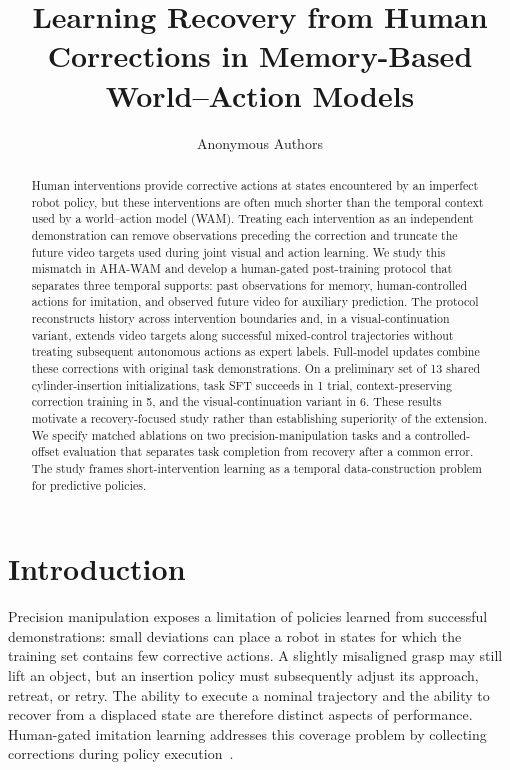 \documentclass[letterpaper,10pt,conference]{ieeeconf}
\title{Learning Recovery from Human Corrections in Memory-Based World--Action Models}
\author{Anonymous Authors}
\begin{document}
\maketitle
\thispagestyle{empty}
\pagestyle{empty}

\begin{abstract}
Human interventions provide corrective actions at states encountered by an imperfect robot policy, but these interventions are often much shorter than the temporal context used by a world--action model (WAM). Treating each intervention as an independent demonstration can remove observations preceding the correction and truncate the future video targets used during joint visual and action learning. We study this mismatch in AHA-WAM and develop a human-gated post-training protocol that separates three temporal supports: past observations for memory, human-controlled actions for imitation, and observed future video for auxiliary prediction. The protocol reconstructs history across intervention boundaries and, in a visual-continuation variant, extends video targets along successful mixed-control trajectories without treating subsequent autonomous actions as expert labels. Full-model updates combine these corrections with original task demonstrations. On a preliminary set of 13 shared cylinder-insertion initializations, task SFT succeeds in 1 trial, context-preserving correction training in 5, and the visual-continuation variant in 6. These results motivate a recovery-focused study rather than establishing superiority of the extension. We specify matched ablations on two precision-manipulation tasks and a controlled-offset evaluation that separates task completion from recovery after a common error. The study frames short-intervention learning as a temporal data-construction problem for predictive policies.
\end{abstract}

\section{Introduction}
Precision manipulation exposes a limitation of policies learned from successful demonstrations: small deviations can place a robot in states for which the training set contains few corrective actions. A slightly misaligned grasp may still lift an object, but an insertion policy must subsequently adjust its approach, retreat, or retry. The ability to execute a nominal trajectory and the ability to recover from a displaced state are therefore distinct aspects of performance. Human-gated imitation learning addresses this coverage problem by collecting corrections during policy execution~\cite{dagger,hgdagger,iwr}.
\end{document}
